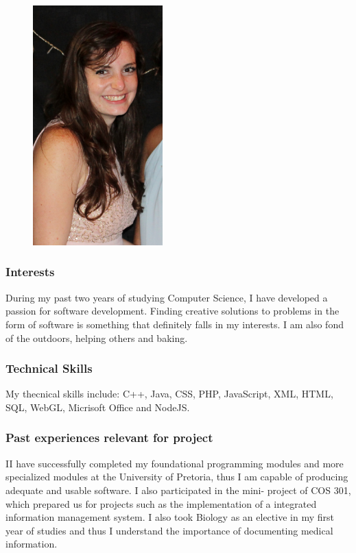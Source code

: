 \documentclass[hidelinks, 12pt, oneside]{article}
\begin{document}
\begin{figure}[h!]
\centering
\includegraphics[width=50mm]{IsabelNel}
\end{figure}

\subsubsection{Interests}
During my past two years of studying Computer Science, I have developed a
passion for software development. Finding creative solutions to problems in
the form of software is something that definitely falls in my interests. I am
also fond of the outdoors, helping others and baking.

\subsubsection{Technical Skills}
My thecnical skills include: C++, Java, CSS, PHP, JavaScript, XML, HTML,
SQL, WebGL, Micrisoft Office and NodeJS.

\subsubsection{Past experiences relevant for project}
II have successfully completed my foundational programming modules and
more specialized modules at the University of Pretoria, thus I am capable
of producing adequate and usable software. I also participated in the mini-
project of COS 301, which prepared us for projects such as the implementation of a integrated information management system. I also took Biology as an elective in my first year of studies and thus I understand  the importance of documenting medical information.
\end{document}
